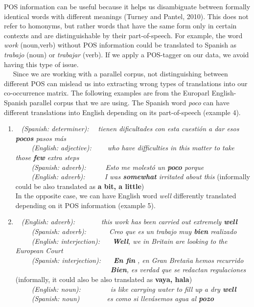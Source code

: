 \documentclass[11pt]{article}
\begin{document}
POS information can be useful because it helps us disambiguate between
formally identical words with different meanings (Turney and Pantel,
2010). This does not refer to homonyms, but rather words that have the
same form only in certain contexts and are distinguishable by their
part-of-speech. For example, the word \emph{work} (noun,verb) without
POS information could be translated to Spanish as \emph{trabajo} (noun)
or \emph{trabajar} (verb). If we apply a POS-tagger on our data, we
avoid having this type of issue.\\
   Since we are working with a parallel corpus, not distinguishing
between different POS can mislead us into extracting wrong types of
translations into our co-occurrence matrix. The following examples are
from the Europarl English-Spanish parallel corpus that we are using. The
Spanish word \emph{poco} can have different translations into English
depending on its part-of-speech (example 4).

\begin{enumerate}
\def\labelenumi{(\arabic{enumi})}
\setcounter{enumi}{3}
\item
    \emph{(Spanish: determiner):   tienen dificultades con esta cuestión
  a dar esos \textbf{pocos} pasos más}\\
       \emph{(English: adjective):     who have difficulties in this
  matter to take those \textbf{few} extra steps}\\
       \emph{(Spanish: adverb):      Esto me molestó un \textbf{poco}
  porque}\\
       \emph{(English: adverb):      I was \textbf{somewhat} irritated
  about this} (informally could be also translated as \textbf{a bit, a
  little})\\
   In the opposite case, we can have English word \emph{well}
  differently translated depending on it POS information (example 5).
\item
  \emph{  (English: adverb):        this work has been carried out
  extremely \textbf{well}\\
       (Spanish: adverb):       Creo que es un trabajo muy \textbf{bien}
  realizado\\
       (English: interjection):    \textbf{Well}, we in Britain are
  looking to the European Court\\
       (Spanish: interjection):    \textbf{En fin} , en Gran Bretaña
  hemos recurrido\\
                              \textbf{Bien}, es verdad que se redactan
  regulaciones} (informally, it could also be also translated as
  \textbf{vaya, hala})\\
  \emph{     (English: noun):         is like carrying water to fill up
  a dry \textbf{well}\\
       (Spanish: noun)        es como si llevásemos agua al
  \textbf{pozo} }
\end{enumerate}
\end{document}
